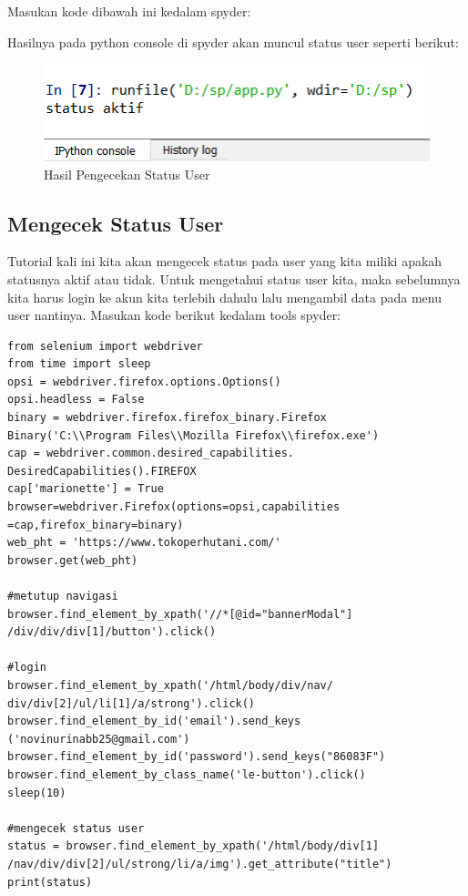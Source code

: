 Masukan kode dibawah ini kedalam spyder:


\newpage
Hasilnya pada python console di spyder akan muncul status user seperti berikut:
\begin{figure}[h]
	\centering
	\includegraphics[scale=0.7]{figures/9StatusUser}
	\caption{Hasil Pengecekan Status User}
\end{figure}

\newpage
\subsection{Mengecek Status User}
Tutorial kali ini kita akan mengecek status pada user yang kita miliki apakah statusnya aktif atau tidak. Untuk mengetahui status user kita, maka sebelumnya kita harus login ke akun kita terlebih dahulu lalu mengambil data pada menu user nantinya.
Masukan kode berikut kedalam tools spyder:
\begin{verbatim}
from selenium import webdriver
from time import sleep
opsi = webdriver.firefox.options.Options()
opsi.headless = False
binary = webdriver.firefox.firefox_binary.Firefox
Binary('C:\\Program Files\\Mozilla Firefox\\firefox.exe')
cap = webdriver.common.desired_capabilities.
DesiredCapabilities().FIREFOX
cap['marionette'] = True
browser=webdriver.Firefox(options=opsi,capabilities
=cap,firefox_binary=binary)
web_pht = 'https://www.tokoperhutani.com/'
browser.get(web_pht)

#metutup navigasi
browser.find_element_by_xpath('//*[@id="bannerModal"]
/div/div/div[1]/button').click()

#login
browser.find_element_by_xpath('/html/body/div/nav/
div/div[2]/ul/li[1]/a/strong').click()
browser.find_element_by_id('email').send_keys
('novinurinabb25@gmail.com')
browser.find_element_by_id('password').send_keys("86083F")
browser.find_element_by_class_name('le-button').click()
sleep(10)

#mengecek status user
status = browser.find_element_by_xpath('/html/body/div[1]
/nav/div/div[2]/ul/strong/li/a/img').get_attribute("title")
print(status)
\end{verbatim}

